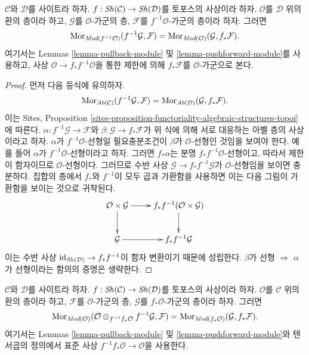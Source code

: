 \begin{lemma}
\label{lemma-adjoint-push-pull-modules}
$\mathcal{C}$와 $\mathcal{D}$를 사이트라 하자.
$f : \mathop{\mathit{Sh}}\nolimits(\mathcal{C}) \to \mathop{\mathit{Sh}}\nolimits(\mathcal{D})$를 토포스의 사상이라 하자.
$\mathcal{O}$를 $\mathcal{D}$ 위의 환의 층이라 하고, $\mathcal{G}$를
$\mathcal{O}$-가군의 층, $\mathcal{F}$를 $f^{-1}\mathcal{O}$-가군의
층이라 하자. 그러면
$$
\mathop{\mathrm{Mor}}\nolimits_{\textit{Mod}(f^{-1}\mathcal{O})}(f^{-1}\mathcal{G}, \mathcal{F})
=
\mathop{\mathrm{Mor}}\nolimits_{\textit{Mod}(\mathcal{O})}(\mathcal{G}, f_*\mathcal{F}).
$$
여기서는 Lemmas \ref{lemma-pullback-module} 및
\ref{lemma-pushforward-module}를 사용하고, 사상
$\mathcal{O} \to f_*f^{-1}\mathcal{O}$을 통한 제한에 의해
$f_*\mathcal{F}$를 $\mathcal{O}$-가군으로 본다.
\end{lemma}

\begin{proof}
먼저 다음 등식에 유의하자.
$$
\mathop{\mathrm{Mor}}\nolimits_{\textit{Ab}(\mathcal{C})}(f^{-1}\mathcal{G}, \mathcal{F})
=
\mathop{\mathrm{Mor}}\nolimits_{\textit{Ab}(\mathcal{D})}(\mathcal{G}, f_*\mathcal{F}).
$$
이는 Sites, Proposition
\ref{sites-proposition-functoriality-algebraic-structures-topoi}에 따른다.
$\alpha : f^{-1}\mathcal{G} \to \mathcal{F}$와
$\beta : \mathcal{G} \to f_*\mathcal{F}$가 위 식에 의해 서로 대응하는
아벨 층의 사상이라고 하자. $\alpha$가 $f^{-1}\mathcal{O}$-선형일
필요충분조건이 $\beta$가 $\mathcal{O}$-선형인 것임을 보여야 한다.
예를 들어 $\alpha$가 $f^{-1}\mathcal{O}$-선형이라고 하자. 그러면
$f_*\alpha$는 분명 $f_*f^{-1}\mathcal{O}$-선형이고, 따라서 제한이
함자이므로 $\mathcal{O}$-선형이다. 그러므로 수반 사상
$\mathcal{G} \to f_*f^{-1}\mathcal{G}$가 $\mathcal{O}$-선형임을
보이면 충분하다. 집합의 층에서 $f_*$와 $f^{-1}$이 모두 곱과 가환함을
사용하면 이는 다음 그림이 가환함을 보이는 것으로 귀착된다.
$$
\xymatrix{
\mathcal{O} \times \mathcal{G} \ar[r] \ar[d] &
f_*f^{-1}(\mathcal{O} \times \mathcal{G}) \ar[d] \\
\mathcal{G} \ar[r] & f_*f^{-1}\mathcal{G}
}
$$
이는 수반 사상 $\text{id}_{\mathop{\mathit{Sh}}\nolimits(\mathcal{D})} \to f_*f^{-1}$이 함자
변환이기 때문에 성립한다. $\beta$가 선형 $\Rightarrow$ $\alpha$가 선형이라는
함의의 증명은 생략한다.
\end{proof}

\begin{lemma}
\label{lemma-adjoint-pull-push-modules}
$\mathcal{C}$와 $\mathcal{D}$를 사이트라 하자.
$f : \mathop{\mathit{Sh}}\nolimits(\mathcal{C}) \to \mathop{\mathit{Sh}}\nolimits(\mathcal{D})$를 토포스의 사상이라 하자.
$\mathcal{O}$를 $\mathcal{C}$ 위의 환의 층이라 하고, $\mathcal{F}$를
$\mathcal{O}$-가군의 층, $\mathcal{G}$를 $f_*\mathcal{O}$-가군의 층이라
하자. 그러면
$$
\mathop{\mathrm{Mor}}\nolimits_{\textit{Mod}(\mathcal{O})}(
\mathcal{O} \otimes_{f^{-1}f_*\mathcal{O}} f^{-1}\mathcal{G}, \mathcal{F})
=
\mathop{\mathrm{Mor}}\nolimits_{\textit{Mod}(f_*\mathcal{O})}(\mathcal{G}, f_*\mathcal{F}).
$$
여기서는 Lemmas \ref{lemma-pullback-module} 및
\ref{lemma-pushforward-module}와 텐서곱의 정의에서 표준 사상
$f^{-1}f_*\mathcal{O} \to \mathcal{O}$을 사용한다.
\end{lemma}

